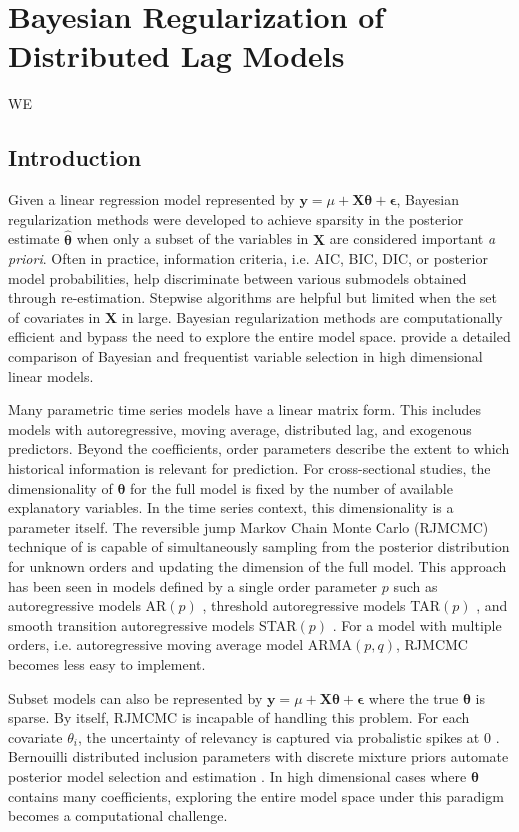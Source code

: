 \chapter{Bayesian Regularization of Distributed Lag Models}
\label{appendix3}
\newpage
WE
\section{Introduction}
Given a linear regression model represented by $\bm{y}=\mu+\bm{X}\bm{\theta}+\bm{\epsilon}$,  Bayesian regularization methods were developed to achieve sparsity in the posterior estimate $\hat{\bm{\theta}}$ when only a subset of the variables in $\bm{X}$ are considered important \textit{a priori}. Often in practice, information criteria, i.e. AIC, BIC, DIC, or posterior model probabilities, help discriminate between various submodels obtained through re-estimation. Stepwise algorithms are helpful but limited when the set of covariates in $\bm{X}$ in large. Bayesian regularization methods are computationally efficient and bypass the need to explore the entire model space. \cite{Mallick2013} provide a detailed comparison of Bayesian and frequentist variable selection in high dimensional linear models.

Many parametric time series models have a linear matrix form. This includes models with autoregressive, moving average, distributed lag, and exogenous predictors. Beyond the coefficients, order parameters describe the extent to which historical information is relevant for prediction. For cross-sectional studies, the dimensionality of $\bm{\theta}$ for the full model is fixed by the number of available explanatory variables. In the time series context, this dimensionality is a parameter itself. The reversible jump Markov Chain Monte Carlo (RJMCMC) technique of \cite{Green1995} is capable of simultaneously sampling from the posterior distribution for unknown orders and updating the dimension of the full model. This approach has been seen in models defined by a single order parameter $p$ such as autoregressive models AR$(p)$ \citep{Troughton1997,Vermaak2004}, threshold autoregressive models TAR$(p)$ \citep{Campbell2004}, and smooth transition autoregressive models STAR$(p)$ \citep{Lopes2006}. For a model with multiple orders, i.e. autoregressive moving average model ARMA$(p,q)$, RJMCMC becomes less easy to implement.

Subset models can also be represented by $\bm{y}=\mu+\bm{X}\bm{\theta}+\bm{\epsilon}$ where the true $\bm{\theta}$ is sparse. By itself, RJMCMC is incapable of handling this problem. For each covariate $\theta_i$, the uncertainty of relevancy is captured via probalistic spikes at 0 \citep{Mitchell1988}. Bernouilli distributed inclusion parameters with discrete mixture priors automate posterior model selection and estimation \citep{George1993,Carlin1995,Kuo1998,Dellaportas2002}. In high dimensional cases where $\bm{\theta}$ contains many coefficients, exploring the entire model space under this paradigm becomes a computational challenge.

